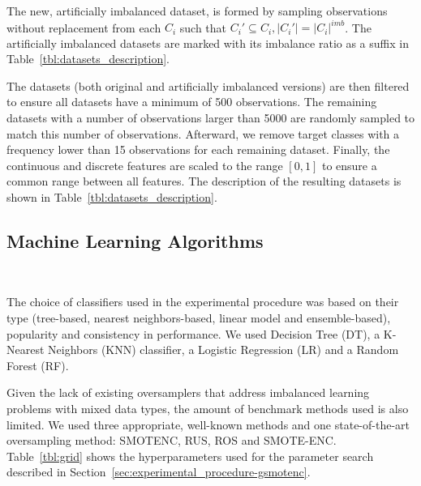 The new, artificially imbalanced dataset, is formed by sampling observations
without replacement from each $C_i$ such that $C_i' \subseteq C_i , |C_i'| =
|C_i|^{imb}$. The artificially imbalanced datasets are marked with its
imbalance ratio as a suffix in Table~\ref{tbl:datasets_description}.

The datasets (both original and artificially imbalanced versions) are then
filtered to ensure all datasets have a minimum of 500 observations.  The
remaining datasets with a number of observations larger than 5000 are randomly
sampled to match this number of observations. Afterward, we remove target
classes with a frequency lower than 15 observations for each remaining
dataset. Finally, the continuous and discrete features are scaled to the range
$[0,1]$ to ensure a common range between all features. The description of the
resulting datasets is shown in Table~\ref{tbl:datasets_description}.



\subsection{Machine Learning Algorithms}~\label{sec:ml_algorithms-gsmotenc}

The choice of classifiers used in the experimental procedure was based on
their type (tree-based, nearest neighbors-based, linear model and
ensemble-based), popularity and consistency in performance. We used Decision
Tree (DT), a K-Nearest Neighbors (KNN) classifier, a Logistic
Regression (LR) and a Random Forest (RF).

Given the lack of existing oversamplers that address imbalanced learning
problems with mixed data types, the amount of benchmark methods used is also
limited. We used three appropriate, well-known methods and one state-of-the-art
oversampling method: SMOTENC, RUS, ROS and SMOTE-ENC\@. Table~\ref{tbl:grid}
shows the hyperparameters used for the parameter search described in
Section~\ref{sec:experimental_procedure-gsmotenc}.

